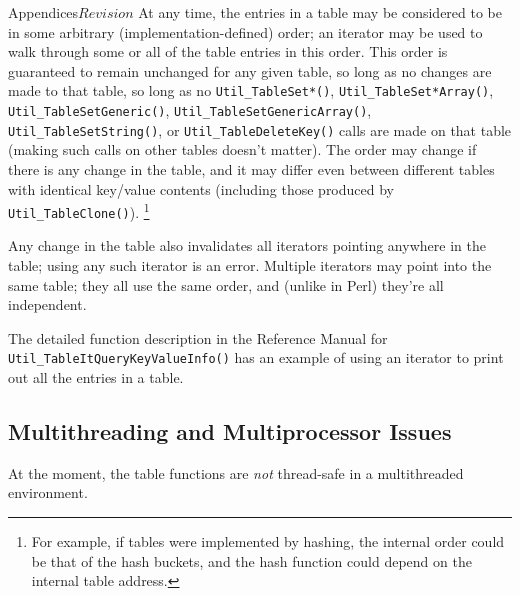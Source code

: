 \begin{cactuspart}{Appendices}{}{$Revision$}
At any time, the entries in a table may be considered to be in some
arbitrary (implementation-defined) order; an iterator may be used to
walk through some or all of the table entries in this order.  This
order is guaranteed to remain unchanged for any given table, so long
as no changes are made to that table, \ie{} so long as no
\verb|Util_TableSet*()|, \verb|Util_TableSet*Array()|,
\verb|Util_TableSetGeneric()|, \verb|Util_TableSetGenericArray()|,
\verb|Util_TableSetString()|, or \verb|Util_TableDeleteKey()| calls
are made on that table (making such calls on other tables doesn't
matter).  The order may change if there is any change in the table,
and it may differ even between different tables with identical key/value
contents (including those produced by \verb|Util_TableClone()|).%
\footnote{%
	 For example, if tables were implemented by hashing,
	 the internal order could be that of the hash buckets,
	 and the hash function could depend on the internal
	 table address.
	 }%
{}

Any change in the table also invalidates all iterators pointing
anywhere in the table; using any such iterator is an error.
Multiple iterators may point into the same table; they all use the
same order, and (unlike in Perl) they're all independent.

The detailed function description
in the Reference Manual
for \verb|Util_TableItQueryKeyValueInfo()| has an example of
using an iterator to print out all the entries in a table.


\subsection{Multithreading and Multiprocessor Issues}

At the moment, the table functions are \emph{not} thread-safe
in a multithreaded environment. 


\end{cactuspart}
